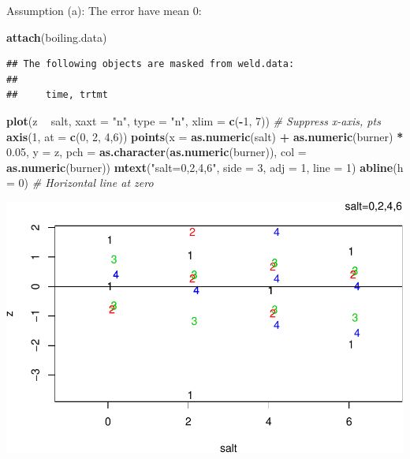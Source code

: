 \documentclass[12pt,]{article}
\newenvironment{Shaded}{\begin{snugshade}}{\end{snugshade}}
\newcommand{\KeywordTok}[1]{\textcolor[rgb]{0.13,0.29,0.53}{\textbf{#1}}}
\newcommand{\DataTypeTok}[1]{\textcolor[rgb]{0.13,0.29,0.53}{#1}}
\newcommand{\DecValTok}[1]{\textcolor[rgb]{0.00,0.00,0.81}{#1}}
\newcommand{\FloatTok}[1]{\textcolor[rgb]{0.00,0.00,0.81}{#1}}
\newcommand{\StringTok}[1]{\textcolor[rgb]{0.31,0.60,0.02}{#1}}
\newcommand{\CommentTok}[1]{\textcolor[rgb]{0.56,0.35,0.01}{\textit{#1}}}
\newcommand{\OperatorTok}[1]{\textcolor[rgb]{0.81,0.36,0.00}{\textbf{#1}}}
\newcommand{\NormalTok}[1]{#1}
\begin{document}
Assumption (a): The error have mean 0:

\begin{Shaded}
\begin{Highlighting}[]
\KeywordTok{attach}\NormalTok{(boiling.data)}
\end{Highlighting}
\end{Shaded}

\begin{verbatim}
## The following objects are masked from weld.data:
## 
##     time, trtmt
\end{verbatim}

\begin{Shaded}
\begin{Highlighting}[]
\KeywordTok{plot}\NormalTok{(z }\OperatorTok{~}\StringTok{ }\NormalTok{salt, }\DataTypeTok{xaxt =} \StringTok{"n"}\NormalTok{, }\DataTypeTok{type =} \StringTok{"n"}\NormalTok{, }\DataTypeTok{xlim =} \KeywordTok{c}\NormalTok{(}\OperatorTok{-}\DecValTok{1}\NormalTok{, }\DecValTok{7}\NormalTok{)) }\CommentTok{# Suppress x-axis, pts}
\KeywordTok{axis}\NormalTok{(}\DecValTok{1}\NormalTok{, }\DataTypeTok{at =} \KeywordTok{c}\NormalTok{(}\DecValTok{0}\NormalTok{, }\DecValTok{2}\NormalTok{, }\DecValTok{4}\NormalTok{,}\DecValTok{6}\NormalTok{))}
\KeywordTok{points}\NormalTok{(}\DataTypeTok{x =} \KeywordTok{as.numeric}\NormalTok{(salt) }\OperatorTok{+}\StringTok{ }\KeywordTok{as.numeric}\NormalTok{(burner) }\OperatorTok{*}\StringTok{ }\FloatTok{0.05}\NormalTok{, }\DataTypeTok{y =}\NormalTok{ z,}
\DataTypeTok{pch =} \KeywordTok{as.character}\NormalTok{(}\KeywordTok{as.numeric}\NormalTok{(burner)), }\DataTypeTok{col =} \KeywordTok{as.numeric}\NormalTok{(burner)) }
\KeywordTok{mtext}\NormalTok{(}\StringTok{"salt=0,2,4,6"}\NormalTok{, }\DataTypeTok{side =} \DecValTok{3}\NormalTok{, }\DataTypeTok{adj =} \DecValTok{1}\NormalTok{, }\DataTypeTok{line =} \DecValTok{1}\NormalTok{)}
\KeywordTok{abline}\NormalTok{(}\DataTypeTok{h =} \DecValTok{0}\NormalTok{) }\CommentTok{# Horizontal line at zero}
\end{Highlighting}
\end{Shaded}

\includegraphics{Markdown_HW_6_files/figure-latex/unnamed-chunk-11-1.pdf}
\end{document}
